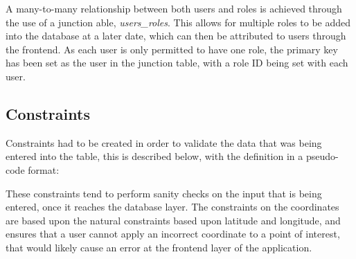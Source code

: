 A many-to-many relationship between both users and roles is achieved through the use of a junction able, \textit{users\_roles}. This allows for multiple roles to be added into the database at a later date, which can then be attributed to users through the frontend. As each user is only permitted to have one role, the primary key has been set as the user in the junction table, with a role ID being set with each user.

\subsection{Constraints}

Constraints had to be created in order to validate the data that was being entered into the table, this is described below, with the definition in a pseudo-code format:

\begin{table}[h]
\centering
{}
\caption{A list of constraints in the points\_of\_interest relation}
\label{poi_constraints}
\end{table}

These constraints tend to perform sanity checks on the input that is being entered, once it reaches the database layer. The constraints on the coordinates are based upon the natural constraints based upon latitude and longitude, and ensures that a user cannot apply an incorrect coordinate to a point of interest, that would likely cause an error at the frontend layer of the application.

